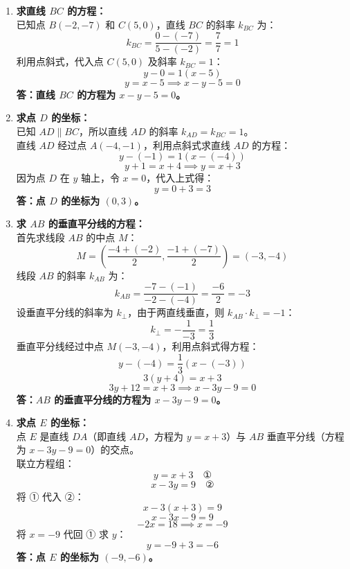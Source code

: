 \documentclass[12pt,a4paper]{exam-zh}
\begin{document}
\begin{solution}
    \begin{enumerate}[label=(\alph*)]
        \item \textbf{求直线 $BC$ 的方程：} \\
        已知点 $B(-2, -7)$ 和 $C(5, 0)$，直线 $BC$ 的斜率 $k_{BC}$ 为：
        $$k_{BC} = \frac{0 - (-7)}{5 - (-2)} = \frac{7}{7} = 1$$
        利用点斜式，代入点 $C(5, 0)$ 及斜率 $k_{BC} = 1$：
        $$y - 0 = 1(x - 5)$$
        $$y = x - 5 \implies x - y - 5 = 0$$
        \textbf{答：直线 $BC$ 的方程为 $x - y - 5 = 0$。}

        \item \textbf{求点 $D$ 的坐标：} \\
        已知 $AD \parallel BC$，所以直线 $AD$ 的斜率 $k_{AD} = k_{BC} = 1$。 \\
        直线 $AD$ 经过点 $A(-4, -1)$，利用点斜式求直线 $AD$ 的方程：
        $$y - (-1) = 1(x - (-4))$$
        $$y + 1 = x + 4 \implies y = x + 3$$
        因为点 $D$ 在 $y$ 轴上，令 $x = 0$，代入上式得：
        $$y = 0 + 3 = 3$$
        \textbf{答：点 $D$ 的坐标为 $(0, 3)$。}

        \item \textbf{求 $AB$ 的垂直平分线的方程：} \\
        首先求线段 $AB$ 的中点 $M$：
        $$M = \left( \frac{-4 + (-2)}{2}, \frac{-1 + (-7)}{2} \right) = (-3, -4)$$
        线段 $AB$ 的斜率 $k_{AB}$ 为：
        $$k_{AB} = \frac{-7 - (-1)}{-2 - (-4)} = \frac{-6}{2} = -3$$
        设垂直平分线的斜率为 $k_{\perp}$，由于两直线垂直，则 $k_{AB} \cdot k_{\perp} = -1$：
        $$k_{\perp} = -\frac{1}{-3} = \frac{1}{3}$$
        垂直平分线经过中点 $M(-3, -4)$，利用点斜式得方程：
        $$y - (-4) = \frac{1}{3}(x - (-3))$$
        $$3(y + 4) = x + 3$$
        $$3y + 12 = x + 3 \implies x - 3y - 9 = 0$$
        \textbf{答：$AB$ 的垂直平分线的方程为 $x - 3y - 9 = 0$。}

        \item \textbf{求点 $E$ 的坐标：} \\
        点 $E$ 是直线 $DA$（即直线 $AD$，方程为 $y = x + 3$）与 $AB$ 垂直平分线（方程为 $x - 3y - 9 = 0$）的交点。 \\
        联立方程组：
        $$y = x + 3 \quad \text{①}$$
        $$x - 3y = 9 \quad \text{②}$$
        将 ① 代入 ②：
        $$x - 3(x + 3) = 9$$
        $$x - 3x - 9 = 9$$
        $$-2x = 18 \implies x = -9$$
        将 $x = -9$ 代回 ① 求 $y$：
        $$y = -9 + 3 = -6$$
        \textbf{答：点 $E$ 的坐标为 $(-9, -6)$。}
    \end{enumerate}
\end{solution}
\end{document}
